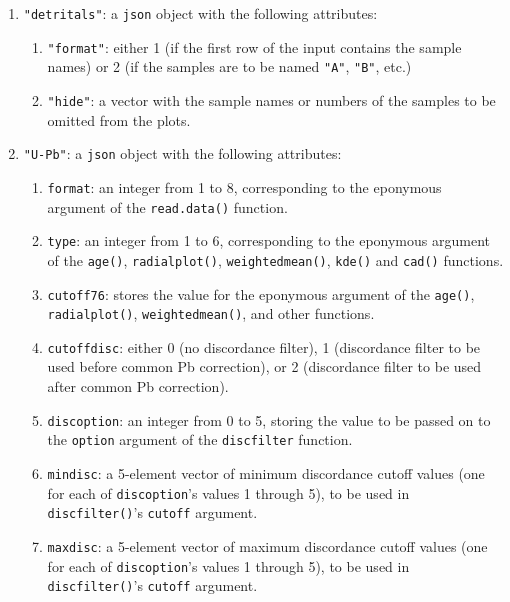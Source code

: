 \begin{refsection}
\begin{enumerate}[leftmargin=\parindent,align=left,
      labelwidth=\parindent,label*=2.\arabic*.]
\begin{enumerate}[leftmargin=\parindent,align=left,labelwidth=\parindent,label*=\arabic*.]
  \item{\tt "mineral"}: either \texttt{"apatite"} or \texttt{"zircon"}.
  \end{enumerate}
\item{\tt "detritals"}: a \texttt{json} object with the following
  attributes:
  \begin{enumerate}[leftmargin=\parindent,align=left,labelwidth=\parindent,label*=\arabic*.]
  \item{\tt "format"}: either 1 (if the first row of the input
    contains the sample names) or 2 (if the samples are to be named
    \texttt{"A"}, \texttt{"B"}, etc.)
  \item{\tt "hide"}: a vector with the sample names or numbers of the
    samples to be omitted from the plots.
  \end{enumerate}
\item{\tt "U-Pb"}: a \texttt{json} object with the following
  attributes:
  \begin{enumerate}[leftmargin=\parindent,align=left,labelwidth=\parindent,label*=\arabic*.]
  \item{\tt format}: an integer from 1 to 8, corresponding to the
    eponymous argument of the \texttt{read.data()} function.
  \item{\tt type}: an integer from 1 to 6, corresponding to the
    eponymous argument of the \texttt{age()}, \texttt{radialplot()},
    \texttt{weightedmean()}, \texttt{kde()} and \texttt{cad()}
    functions.
  \item{\tt cutoff76}: stores the value for the eponymous argument of
    the \texttt{age()}, \texttt{radialplot()},
    \texttt{weightedmean()}, and other functions.
  \item{\tt cutoffdisc}: either 0 (no discordance filter), 1
    (discordance filter to be used before common Pb correction), or 2
    (discordance filter to be used after common Pb correction).
  \item{\tt discoption}: an integer from 0 to 5, storing the value to be
    passed on to the \texttt{option} argument of the
    \texttt{discfilter} function.
  \item{\tt mindisc}: a 5-element vector of minimum discordance cutoff
    values (one for each of \texttt{discoption}'s values 1 through 5),
    to be used in \texttt{discfilter()}'s \texttt{cutoff} argument.
  \item{\tt maxdisc}: a 5-element vector of maximum discordance cutoff
    values (one for each of \texttt{discoption}'s values 1 through 5),
    to be used in \texttt{discfilter()}'s \texttt{cutoff} argument.

\end{enumerate}
\end{enumerate}
\end{refsection}
